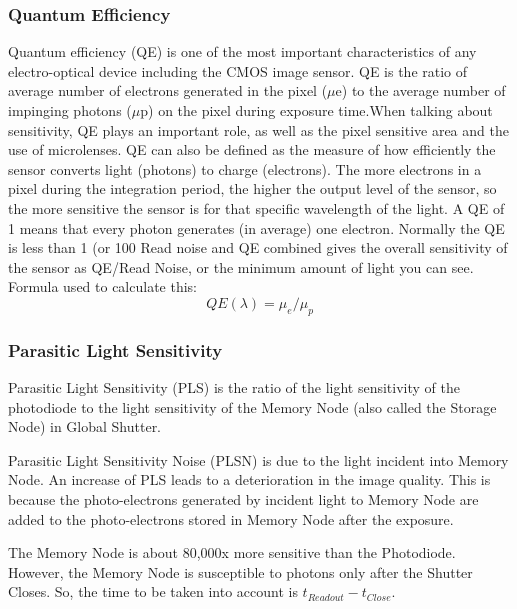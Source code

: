 \documentclass[../../main.tex]{subfiles}
\begin{document}
\subsubsection{Quantum Efficiency} %
Quantum efficiency (QE) is one of the most important characteristics of any electro-optical
device including the CMOS image sensor. QE is the ratio of average number of electrons
generated in the pixel ($\mu$e) to the average number of impinging photons ($\mu$p) 
on the pixel during exposure time.When talking about sensitivity, QE plays an important role, as well as
the pixel sensitive area and the use of microlenses. QE can also be defined as the 
measure of how efficiently the sensor converts light (photons) to charge
(electrons). The more electrons in a pixel during the integration period, the
higher the output level of the sensor, so the more sensitive the sensor is for
that specific wavelength of the light. A QE of 1 means that every photon
generates (in average) one electron. Normally the QE is less than 1 (or 100%
Read noise and QE combined gives the overall sensitivity of the sensor as QE/Read
Noise, or the minimum amount of light you can see.
Formula used to calculate this:
\begin{equation}
    QE(\lambda)= \mu_e/\mu_p
\end{equation}



\subsubsection{Parasitic Light Sensitivity} %
Parasitic Light Sensitivity (PLS) is the ratio of the light sensitivity of the photodiode to the light sensitivity of the Memory Node (also called the Storage Node) in Global Shutter. \newline

Parasitic Light Sensitivity Noise (PLSN) is due to the light incident into Memory Node. An increase of PLS leads to a deterioration in the image quality.  This  is  because  the  photo-electrons  generated  by  incident  light  to  Memory Node  are  added  to  the  photo-electrons stored in Memory Node after the exposure. \newline

The Memory Node is about 80,000x more sensitive than the Photodiode. However, the Memory Node is susceptible to photons only after the Shutter Closes. So, the time to be taken into account is $t_{Readout} - t_{Close}$. \newline
\end{document}

